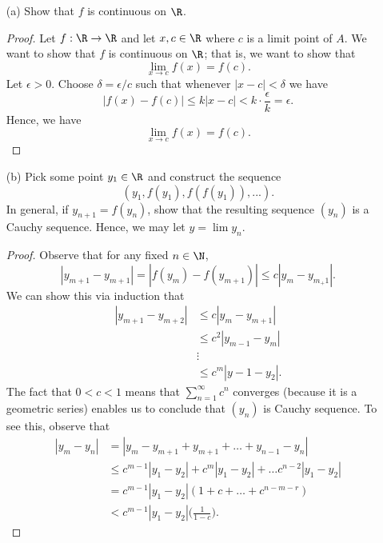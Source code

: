 \begin{enumerate}
    \item[(a)] Show that \( f  \) is continuous on \( \R  \).
        \begin{proof}
        Let \( f: \R  \to \R  \) and let \( x,c \in \R   \) where \( c  \) is a limit point of \( A  \). We want to show that \( f \) is continuous on \( \R  \); that is, we want to show that 
        \[  \lim_{ x \to c } f(x) = f(c). \]
        Let \( \epsilon > 0  \). Choose \( \delta = \epsilon / c  \) such that whenever \( | x - c  | < \delta \) we have 
        \[  | f(x) - f(c) | \leq k | x - c  | < k \cdot \frac{ \epsilon  }{ k } = \epsilon. \]
        Hence, we have 
        \[ \lim_{ x \to c } f(x) = f(c). \]
        \end{proof}
    \item[(b)] Pick some point \( y_1 \in \R  \) and construct the sequence 
        \[  (y_1, f(y_1), f(f(y_1)), ...).\]
        In general, if \( y_{n+1} = f(y_n) \), show that the resulting sequence \( (y_n) \) is a Cauchy sequence. Hence, we may let \( y = \lim y_n \).
        \begin{proof}
        Observe that for any fixed \( n \in \N  \), 
        \[ | y_{m+1} - y_{m+1} | = | f(y_m) - f(y_{m+1}) | \leq c | y_m - y_{m_+1} |. \] We can show this via induction that 
        \begin{align*}
            | y_{m+1} - y_{m+2} | &\leq c | y_{m} - y_{m+1}  |  \\
                                  &\leq c^2 | y_{m-1} - y_m | \\
                                  &\vdots \\
                                  &\leq c^m | y-1 - y_2 |.
        \end{align*}
        The fact that \( 0 < c <  1 \) means that \( \sum_{ n=1 }^{ \infty  } c^n  \) converges (because it is a geometric series) enables us to conclude that \( (y_n) \) is Cauchy sequence. To see this, observe that 
        \begin{align*}
            | y_m  - y_n  | &= | y_m - y_{m+1} + y_{m+1} + \dots + y_{n-1} - y_n |  \\
                            &\leq c^{m-1} | y_1 - y_2  | + c^m | y_1 - y_2  | + \dots c^{n-2} | y_1 - y_2  | \\ 
                            &= c^{m-1} | y_1 - y_2  | (1 + c + \dots + c^{n - m - r }) \\
                            &< c^{m-1} | y_1 - y_2  | \Big( \frac{ 1 }{ 1 - c  }  \Big).

\end{align*}
\end{proof}
\end{enumerate}
